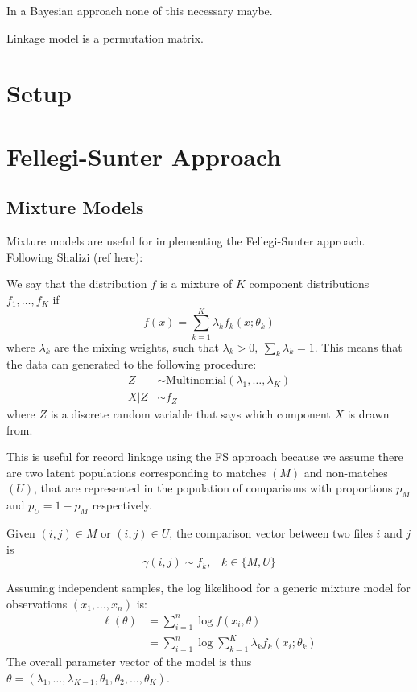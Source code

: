 \documentclass[11pt,reqno]{amsart}
\begin{document}
In a Bayesian approach none of this necessary maybe. 

Linkage model is a permutation matrix. 
\section{Setup}


\section{Fellegi-Sunter Approach}
\subsection{Mixture Models}
Mixture models are useful for implementing the Fellegi-Sunter approach.  Following Shalizi (ref here):  

We say that the distribution $f$ is a mixture of $K$ component distributions $f_1, \dots, f_K$ if 
\[ f(x) = \sum_{k=1}^K \lambda_k f_k(x; \theta_k) \] 
where $\lambda_k$ are the mixing weights, such that $\lambda_k>0, \ \sum_k \lambda_k = 1$.  This means that the data can generated to the following procedure: 
\begin{align*}
Z &\sim \text{Multinomial}(\lambda_1, \dots, \lambda_K) \\
X | Z &\sim f_{Z}
\end{align*}
where $Z$ is a discrete random variable that says which component $X$ is drawn from. 

This is useful for record linkage using the FS approach because we assume there are two latent populations corresponding to matches $(M)$ and non-matches $(U)$, that are represented in the population of comparisons with proportions $p_M$ and $p_U = 1 - p_M$ respectively.  


Given $(i,j) \in M$ or $ (i,j)\in U$, the comparison vector between two files $i$ and $j$ is
\[ \gamma(i,j) \sim f_{k}, \hspace{10pt} k\in\{M,U\} \]


Assuming independent samples, the log likelihood for a generic mixture model for observations $(x_1,\dots, x_n)$ is:
\begin{align} 
\ell(\theta) &= \sum_{i=1}^n \log f(x_i,\theta)  \\
		&= \sum_{i=1}^n \log \sum_{k=1}^K \lambda_k f_k(x_i; \theta_k)  \label{eq:llh}
\end{align}
The overall parameter vector of the model is thus $\theta = (\lambda_1,\dots,\lambda_{K-1}, \theta_1, \theta_2, \dots, \theta_K)$.  
\end{document}
